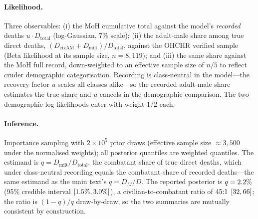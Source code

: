 \paragraph{Likelihood.} Three observables: (i) the MoH cumulative total against the model's \emph{recorded} deaths $u\cdot D_{\mathrm{total}}$ (log-Gaussian, $7\%$ scale); (ii) the adult-male share among true direct deaths, $(D_{\mathrm{civAM}}+D_{\mathrm{milt}})/D_{\mathrm{total}}$, against the OHCHR verified sample (Beta likelihood at its sample size, $n=8{,}119$); and (iii) the same share against the MoH full record, down-weighted to an effective sample size of $n/5$ to reflect cruder demographic categorisation. Recording is class-neutral in the model---the recovery factor $u$ scales all classes alike---so the recorded adult-male share estimates the true share and $u$ cancels in the demographic comparison. The two demographic log-likelihoods enter with weight $1/2$ each.

\paragraph{Inference.} Importance sampling with $2\times 10^5$ prior draws (effective sample size ${\approx}3{,}500$ under the normalised weights); all posterior quantiles are weighted quantiles. The estimand is $q=D_{\mathrm{milt}}/D_{\mathrm{total}}$, the combatant share of true direct deaths, which under class-neutral recording equals the combatant share of recorded deaths---the same estimand as the main text's $q=D_M/D$. The reported posterior is $q=2.2{}\%$ (95\% credible interval $[1.5{}\%,3.0{}\%]$), a civilian-to-combatant ratio of $45{}{:}1$ $[32{},66{}]$; the ratio is $(1-q)/q$ draw-by-draw, so the two summaries are mutually consistent by construction.

